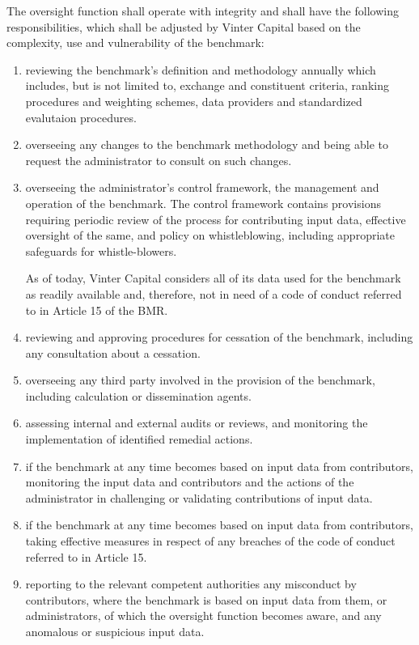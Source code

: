 \documentclass{article}
\begin{document}
The oversight function shall operate with integrity and shall have the
following responsibilities, which shall be adjusted by Vinter Capital
based on the complexity, use and vulnerability of the benchmark:

\begin{enumerate}
\def\labelenumi{\arabic{enumi}.}
\item
  reviewing the benchmark's definition and methodology annually which
  includes, but is not limited to, exchange and constituent criteria,
  ranking procedures and weighting schemes, data providers and
  standardized evalutaion procedures.
\item
  overseeing any changes to the benchmark methodology and being able to
  request the administrator to consult on such changes.
\item
  overseeing the administrator's control framework, the management and
  operation of the benchmark. The control framework contains provisions
  requiring periodic review of the process for contributing input data,
  effective oversight of the same, and policy on whistleblowing,
  including appropriate safeguards for whistle-blowers.

  As of today, Vinter Capital considers all of its data used for the
  benchmark as readily available and, therefore, not in need of a code
  of conduct referred to in Article 15 of the BMR.
\item
  reviewing and approving procedures for cessation of the benchmark,
  including any consultation about a cessation.
\item
  overseeing any third party involved in the provision of the benchmark,
  including calculation or dissemination agents.
\item
  assessing internal and external audits or reviews, and monitoring the
  implementation of identified remedial actions.
\item
  if the benchmark at any time becomes based on input data from
  contributors, monitoring the input data and contributors and the
  actions of the administrator in challenging or validating
  contributions of input data.
\item
  if the benchmark at any time becomes based on input data from
  contributors, taking effective measures in respect of any breaches of
  the code of conduct referred to in Article 15.
\item
  reporting to the relevant competent authorities any misconduct by
  contributors, where the benchmark is based on input data from them, or
  administrators, of which the oversight function becomes aware, and any
  anomalous or suspicious input data.
\end{enumerate}
\end{document}
